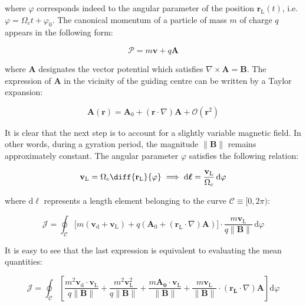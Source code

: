where $\varphi$ corresponds indeed to the angular parameter of the position $\mathbf{r}_\text{L}(t)$, i.e. $\varphi=\Omega_ct+\varphi_0$. The canonical momentum of a particle of mass $m$ of charge $q$ appears in the following form:

\begin{equation}
    \boldsymbol{\mathcal{P}}=m\mathbf{v}+q\mathbf{A}
\end{equation}

where $\mathbf{A}$ designates the vector potential which satisfies $\nabla\times\mathbf{A}=\mathbf{B}$. The expression of $\mathbf{A}$ in the vicinity of the guiding centre can be written by a Taylor expansion:

\begin{equation}
    \mathbf{A}(\mathbf{r})=\mathbf{A}_0+(\mathbf{r}\cdot\nabla)\mathbf{A}+\mathcal{O}(\mathbf{r}^2)
\end{equation}

It is clear that the next step is to account for a slightly variable magnetic field. In other words, during a gyration period, the magnitude $\|\mathbf{B}\|$ remains approximately constant. The angular parameter $\varphi$ satisfies the following relation:

\begin{equation}
    \mathbf{v}_\text{L}=\Omega_c\diff{\mathbf{r}_\text{L}}{\varphi}\implies\mathrm{d}\boldsymbol{\ell}=\frac{\mathbf{v}_\text{L}}{\Omega_c}\,\mathrm{d}\varphi
\end{equation}

where $\mathrm{d}\boldsymbol{\ell}$ represents a length element belonging to the curve $\mathcal{C}\equiv[0,2\pi)$:

\begin{equation}
    \mathcal{J}=\oint_\mathcal{C}\bigg[m(\mathbf{v}_\mathrm{d}+\mathbf{v}_\text{L})+q(\mathbf{A}_0+(\mathbf{r}_\text{L}\cdot\nabla)\mathbf{A})\bigg]\cdot\frac{m\mathbf{v}_\text{L}}{q\|\mathbf{B}\|}\,\mathrm{d}\varphi
\end{equation}

It is easy to see that the last expression is equivalent to evaluating the mean quantities:

\begin{equation}
    \mathcal{J}=\oint_\mathcal{C}\left[\frac{m^2\mathbf{v}_\mathrm{d}\cdot\mathbf{v}_\text{L}}{q\|\mathbf{B}\|}+\frac{m^2\mathbf{v}_\text{L}^2}{q\|\mathbf{B}\|}+\frac{m\mathbf{A_0}\cdot\mathbf{v}_\text{L}}{\|\mathbf{B}\|}+\frac{m\mathbf{v}_\text{L}}{\|\mathbf{B}\|}\cdot(\mathbf{r_\text{L}}\cdot\nabla)\mathbf{A}\right]\mathrm{d}\varphi
\end{equation}

